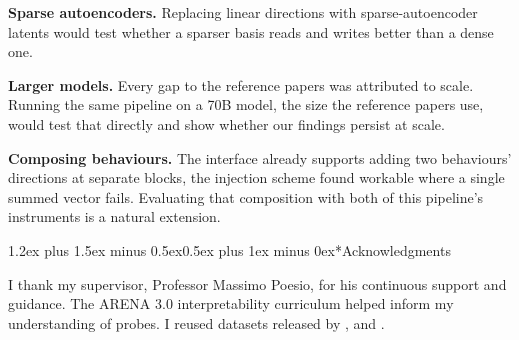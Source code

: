 \documentclass[conference]{IEEEtran}
\makeatletter
\renewcommand{\section}{\@startsection{section}{1}{\z@}%
  {1.2ex plus 1.5ex minus 0.5ex}{0.5ex plus 1ex minus 0ex}{\normalfont\normalsize\centering\scshape}}
\makeatother
\begin{document}
\textbf{Sparse autoencoders.} Replacing linear directions with
sparse-autoencoder latents \citep{cunningham2023,bricken2023} would test
whether a sparser basis reads and writes better than a dense one.

\textbf{Larger models.} Every gap to the reference papers was attributed
to scale. Running the same pipeline on a 70B model, the size the reference papers
use, would test that directly and show whether our findings persist
at scale.

\textbf{Composing behaviours.} The interface already supports adding two behaviours'
directions at separate blocks, the injection scheme \citet{vanderweij2024}
found workable where a single summed vector fails. Evaluating that
composition with both of this pipeline's instruments is a natural
extension.

\section*{Acknowledgments}

I thank my supervisor, Professor Massimo Poesio, for his continuous support and guidance. The ARENA 3.0 interpretability curriculum \citep{arena2024} helped inform my understanding of probes. I reused datasets
released by \citet{goldowsky2025}, \citet{mckenzie2025} and \citet{cincynlp2025}.
\end{document}
